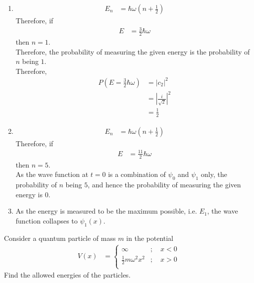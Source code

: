 \documentclass[titlepage, fleqn, a4paper, 12pt, twoside]{article}
\theoremstyle{definition}
\theoremstyle{theorem}
\begin{document}
\begin{solution}
	\begin{enumerate}[leftmargin=*]
		\item
			\begin{align*}
				E_n &= \hbar \omega \left( n + \frac{1}{2} \right)
			\end{align*}
			Therefore, if
			\begin{align*}
				E &= \frac{3}{2} \hbar \omega
			\end{align*}
			then $n = 1$.\\
			Therefore, the probability of measuring the given energy is the probability of $n$ being $1$.\\
			Therefore,
			\begin{align*}
				P\left( E = \frac{3}{2} \hbar \omega \right) &= |c_2|^2\\
				&= \left| \frac{i}{\sqrt{2}} \right|^2\\
				&= \frac{1}{2}
			\end{align*}
		\item
			\begin{align*}
				E_n &= \hbar \omega \left( n + \frac{1}{2} \right)
			\end{align*}
			Therefore, if
			\begin{align*}
				E &= \frac{11}{2} \hbar \omega
			\end{align*}
			then $n = 5$.\\
			As the wave function at $t = 0$ is a combination of $\psi_0$ and $\psi_1$ only, the probability of $n$ being $5$, and hence the probability of measuring the given energy is $0$.
		\item
			As the energy is measured to be the maximum possible, i.e. $E_1$, the wave function collapses to $\psi_1(x)$.
	\end{enumerate}
\end{solution}

\begin{question}
	Consider a quantum particle of mass $m$ in the potential
	\begin{align*}
		V(x) &=
			\begin{cases}
				\infty &;\quad x < 0\\
				\frac{1}{2} m \omega^2 x^2 &;\quad x > 0\\
			\end{cases}
	\end{align*}
	Find the allowed energies of the particles.
\end{question}
\end{document}
